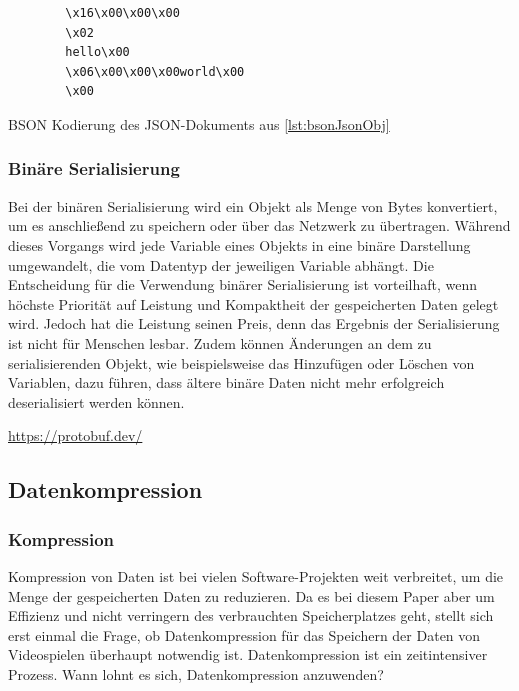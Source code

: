 \begin{listing}[htp]
    \begin{verbatim} 
        \x16\x00\x00\x00           
        \x02                      
        hello\x00                  
        \x06\x00\x00\x00world\x00  
        \x00                       
    \end{verbatim}
    \caption{BSON Kodierung des JSON-Dokuments aus \ref{lst:bsonJsonObj} \cite{mongodbJSONBSON}}
    \label{lst:bsonExp}
\end{listing}

\subsubsection{Binäre Serialisierung}
Bei der binären Serialisierung wird ein Objekt als Menge von Bytes konvertiert, um es anschließend zu speichern oder über das Netzwerk zu übertragen. Während dieses Vorgangs wird jede Variable eines Objekts in eine binäre Darstellung umgewandelt, die vom Datentyp der jeweiligen Variable abhängt. Die Entscheidung für die Verwendung binärer Serialisierung ist vorteilhaft, wenn höchste Priorität auf Leistung und Kompaktheit der gespeicherten Daten gelegt wird. Jedoch hat die Leistung seinen Preis, denn das Ergebnis der Serialisierung ist nicht für Menschen lesbar. Zudem können Änderungen an dem zu serialisierenden Objekt, wie beispielsweise das Hinzufügen oder Löschen von Variablen, dazu führen, dass ältere binäre Daten nicht mehr erfolgreich deserialisiert werden können.\cite{microsoftBinarySerialization}\cite{programmathicallyUnderstandingBinary}

\url{https://protobuf.dev/}


\subsection{Datenkompression}
\subsubsection{Kompression}
Kompression von Daten ist bei vielen Software-Projekten weit verbreitet, um die Menge der gespeicherten Daten zu reduzieren. Da es bei diesem Paper aber um Effizienz und nicht verringern des verbrauchten Speicherplatzes geht, stellt sich erst einmal die Frage, ob Datenkompression für das Speichern der Daten von Videospielen überhaupt notwendig ist. Datenkompression ist ein zeitintensiver Prozess. Wann lohnt es sich, Datenkompression anzuwenden? 

